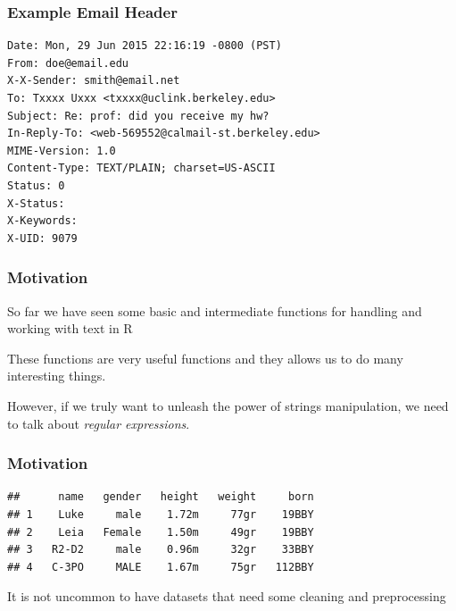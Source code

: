 \documentclass[12pt]{beamer}\usepackage[]{graphicx}\usepackage[]{color}
\makeatletter
\newenvironment{kframe}{%
 \def\at@end@of@kframe{}%
 \ifinner\ifhmode%
  \def\at@end@of@kframe{\end{minipage}}%
  \begin{minipage}{\columnwidth}%
 \fi\fi%
 \def\FrameCommand##1{\hskip\@totalleftmargin \hskip-\fboxsep
 \colorbox{shadecolor}{##1}\hskip-\fboxsep
     \hskip-\linewidth \hskip-\@totalleftmargin \hskip\columnwidth}%
 \MakeFramed {\advance\hsize-\width
   \@totalleftmargin\z@ \linewidth\hsize
   \@setminipage}}%
 {\par\unskip\endMakeFramed%
 \at@end@of@kframe}
\newenvironment{knitrout}{}{} %
\makeatother
\begin{document}

\begin{frame}[fragile]
\frametitle{Example Email Header}

\begin{verbatim}
Date: Mon, 29 Jun 2015 22:16:19 -0800 (PST)
From: doe@email.edu
X-X-Sender: smith@email.net
To: Txxxx Uxxx <txxxx@uclink.berkeley.edu>
Subject: Re: prof: did you receive my hw?
In-Reply-To: <web-569552@calmail-st.berkeley.edu>
MIME-Version: 1.0
Content-Type: TEXT/PLAIN; charset=US-ASCII
Status: 0
X-Status: 
X-Keywords:
X-UID: 9079
\end{verbatim}

\end{frame}


\begin{frame}
\begin{center}
\Huge{}
\end{center}
\end{frame}


\begin{frame}
\frametitle{Motivation}

\bbi
  \item So far we have seen some basic and intermediate functions for handling and working with text in R
  \item These functions are very useful functions and they allows us to do many interesting things. 
  \item However, if we truly want to unleash the power of strings manipulation, we need to talk about \textit{regular expressions}.
\ei



\end{frame}


\begin{frame}[fragile]
\frametitle{Motivation}

\begin{knitrout}\footnotesize
{}\color{fgcolor}\begin{kframe}
\begin{verbatim}
##      name   gender   height   weight     born
## 1    Luke     male    1.72m     77gr    19BBY
## 2    Leia   Female    1.50m     49gr    19BBY
## 3   R2-D2     male    0.96m     32gr    33BBY
## 4   C-3PO     MALE    1.67m     75gr   112BBY
\end{verbatim}
\end{kframe}
\end{knitrout}

\pause
It is not uncommon to have datasets that need some cleaning and preprocessing

\end{frame}
\end{document}

